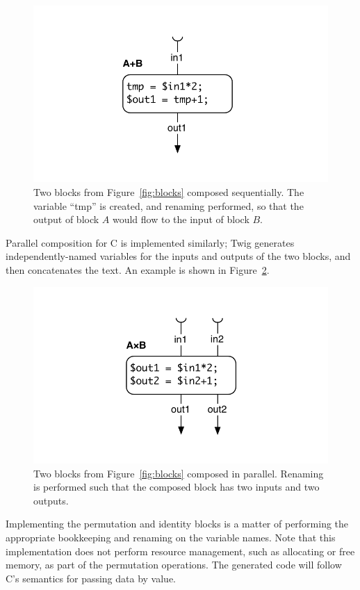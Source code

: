 \begin{figure}[ht]
\centering
\includegraphics[width=0.75\columnwidth]{images/code-gen2}
\caption{Two blocks from Figure~\ref{fig:blocks} composed 
sequentially. The variable ``tmp'' is created, and renaming 
performed, so that the output of block $A$ would flow to the input 
of block $B$.}
\label{fig:codegen-seq}
\end{figure}

Parallel composition for C is implemented similarly; Twig
generates independently-named variables for the inputs and outputs
of the two blocks, and then concatenates the text. An example is
shown in Figure~\ref{fig:codegen-par}.

\begin{figure}[ht]
\centering
\includegraphics[width=0.75\columnwidth]{images/code-gen3}
\caption{Two blocks from Figure~\ref{fig:blocks} composed in 
parallel. Renaming is performed such that the composed block has 
two inputs and two outputs.}
\label{fig:codegen-par}
\end{figure}

Implementing the permutation and identity blocks is a matter of
performing the appropriate bookkeeping and renaming on the
variable names. Note that this implementation does not perform
resource management, such as allocating or free memory, as part of
the permutation operations. The generated code will follow C's
semantics for passing data by value.
